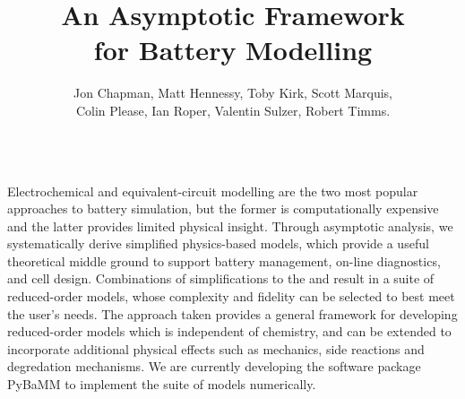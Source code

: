\documentclass{beamer}
\author[]{
  	Jon Chapman,
  	Matt Hennessy,
  	Toby Kirk,
	Scott Marquis,\\
  	Colin Please,
  	Ian Roper,
	Valentin Sulzer,
	Robert Timms.
}
\title{An Asymptotic Framework\\ for Battery Modelling}
\institute{Your Institution}
\begin{document}
\begin{frame}[fragile]
\centering

\vspace{-2em}
\begin{columns}
  \begin{column}{0.87\linewidth}
	\begin{topblock}{}
	  \small

Electrochemical and equivalent-circuit modelling are the two most popular approaches to battery simulation, but the former is computationally expensive and the latter provides limited physical insight. Through asymptotic analysis, we systematically derive simplified physics-based models, which provide a useful theoretical middle ground to support battery management, on-line diagnostics, and cell design. Combinations of simplifications to the {} and {} result in a suite of reduced-order models, whose complexity and fidelity can be selected to best meet the user's needs. The approach taken provides a general framework for developing reduced-order models which is independent of chemistry, and can be extended to incorporate additional physical effects such as mechanics, side reactions and degredation mechanisms. We are currently developing the software package PyBaMM to implement the suite of models numerically.


\end{topblock}
  \end{column}
\end{columns}




\end{frame}
\end{document}
